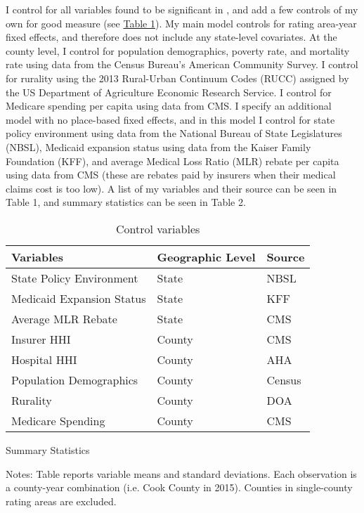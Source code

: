 \documentclass[12pt,letterpaper]{article}
\begin{document}
I control for all variables found to be significant in \citet{griffith_diminishing_2018}, and add a few controls of my own for good measure (see \hyperref[Table 1]{Table 1}).  My main model controls for rating area-year fixed effects, and therefore does not include any state-level covariates.  At the county level, I control for population demographics, poverty rate, and mortality rate using data from the Census Bureau's American Community Survey. I control for rurality using the 2013 Rural-Urban Continuum Codes (RUCC) assigned by the US Department of Agriculture Economic Research Service. I control for Medicare spending per capita using data from CMS.  I specify an additional model with no place-based fixed effects, and in this model I control for state policy environment using data from the National Bureau of State Legislatures (NBSL), Medicaid expansion status using data from the Kaiser Family Foundation (KFF), and average Medical Loss Ratio (MLR) rebate per capita using data from CMS (these are rebates paid by insurers when their medical claims cost is too low). A list of my variables and their source can be seen in Table 1, and summary statistics can be seen in Table 2. 

\vspace{1cm}

\begin{table}[H]
\caption{Control variables} \label{Table 1}
\centering
\begin{tabular}{l l l}
\toprule
\textbf{Variables} & \textbf{Geographic Level} & \textbf{Source}\\
\midrule
State Policy Environment & State & NBSL \\
Medicaid Expansion Status & State & KFF \\
Average MLR Rebate & State & CMS \\
Insurer HHI & County & CMS \\
Hospital HHI & County & AHA \\
Population Demographics & County & Census\\
Rurality & County & DOA\\
Medicare Spending & County & CMS \\
\bottomrule
\end{tabular}
\end{table} 

\newpage
{}
\begin{landscape}
\begin{table}[!h]
\scriptsize
	\caption{Summary Statistics}
	\centering
	
\end{table}
\flushleft \footnotesize{Notes: Table reports variable means and standard deviations. Each observation is a county-year combination (i.e. Cook County in 2015). Counties in single-county rating areas are excluded.}
\end{landscape}
\restoregeometry
\end{document}
